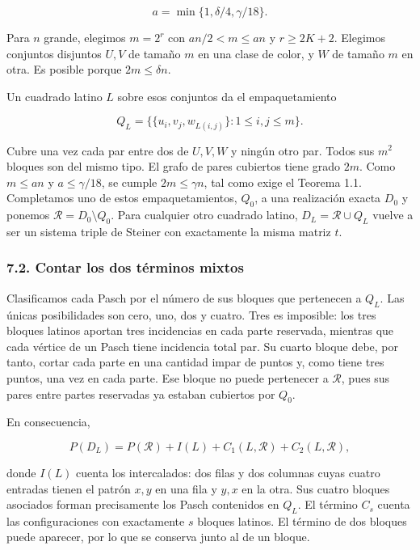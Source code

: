 \documentclass[spanish,11pt,a4paper]{article}
\begin{document}
\[a=\min\{1,\delta/4,\gamma/18\}.\]

Para \(n\) grande, elegimos \(m=2^r\) con \(an/2<m\le an\) y \(r\ge2K+2\). Elegimos conjuntos disjuntos \(U,V\) de tamaño \(m\) en una clase de color, y \(W\) de tamaño \(m\) en otra. Es posible porque \(2m\le\delta n\).

Un cuadrado latino \(L\) sobre esos conjuntos da el empaquetamiento

\[Q_L=\{\{u_i,v_j,w_{L(i,j)}\}:1\le i,j\le m\}.\]

Cubre una vez cada par entre dos de \(U,V,W\) y ningún otro par. Todos sus \(m^2\) bloques son del mismo tipo. El grafo de pares cubiertos tiene grado \(2m\). Como \(m\le an\) y \(a\le\gamma/18\), se cumple \(2m\le\gamma n\), tal como exige el Teorema 1.1. Completamos uno de estos empaquetamientos, \(Q_0\), a una realización exacta \(D_0\) y ponemos \(\mathcal R=D_0\setminus Q_0\). Para cualquier otro cuadrado latino, \(D_L=\mathcal R\cup Q_L\) vuelve a ser un sistema triple de Steiner con exactamente la misma matriz \(t\).

\subsubsection{7.2. Contar los dos términos mixtos}\label{contar-los-dos-tuxe9rminos-mixtos}

Clasificamos cada Pasch por el número de sus bloques que pertenecen a \(Q_L\). Las únicas posibilidades son cero, uno, dos y cuatro. Tres es imposible: los tres bloques latinos aportan tres incidencias en cada parte reservada, mientras que cada vértice de un Pasch tiene incidencia total par. Su cuarto bloque debe, por tanto, cortar cada parte en una cantidad impar de puntos y, como tiene tres puntos, una vez en cada parte. Ese bloque no puede pertenecer a \(\mathcal R\), pues sus pares entre partes reservadas ya estaban cubiertos por \(Q_0\).

En consecuencia,

\[P(D_L)=P(\mathcal R)+I(L)+C_1(L,\mathcal R)+C_2(L,\mathcal R),\tag{7.1}\]

donde \(I(L)\) cuenta los intercalados: dos filas y dos columnas cuyas cuatro entradas tienen el patrón \(x,y\) en una fila y \(y,x\) en la otra. Sus cuatro bloques asociados forman precisamente los Pasch contenidos en \(Q_L\). El término \(C_s\) cuenta las configuraciones con exactamente \(s\) bloques latinos. El término de dos bloques puede aparecer, por lo que se conserva junto al de un bloque.
\end{document}

